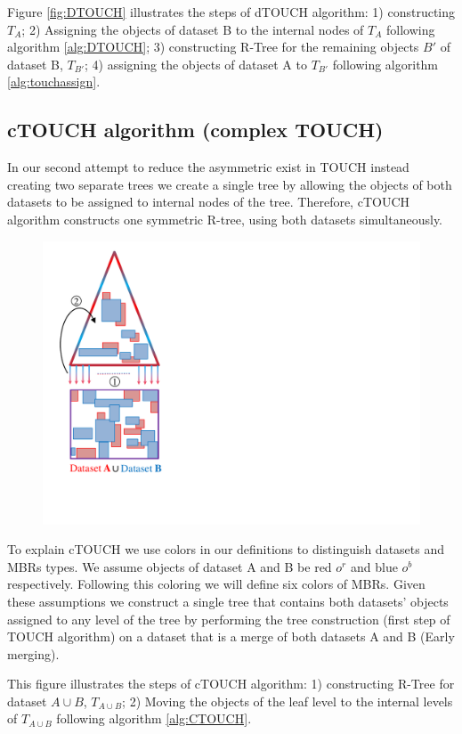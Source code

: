 \documentclass{vldb}
\newcommand{\SJ}{TOUCH}
\newcommand{\dSJ}{dTOUCH}
\newcommand{\cSJ}{cTOUCH}
\begin{document}
Figure \ref{fig:DTOUCH} illustrates the steps of {\dSJ} algorithm: 1) constructing $T_A$; 2) Assigning the objects of dataset B to the internal nodes of $T_A$ following algorithm \ref{alg:DTOUCH}; 3) constructing R-Tree for the remaining objects $B'$ of dataset B, $T_{B'}$; 4) assigning the objects of dataset A to $T_{B'}$ following algorithm \ref{alg:touchassign}.

\subsection{{\cSJ} algorithm (complex {\SJ})}

In our second attempt to reduce the asymmetric exist in {\SJ} instead creating two separate trees we create a single tree by allowing the objects of both datasets to be assigned to internal nodes of the tree. Therefore, {\cSJ} algorithm constructs one symmetric R-tree, using both datasets simultaneously.

\begin{figure}
    \centering
    \includegraphics[width=0.48\columnwidth]{figures/CTouch}
\end{figure}

To explain {\cSJ} we use colors in our definitions to distinguish datasets and MBRs types. We assume objects of dataset A and B be red $o^r$ and blue $o^b$ respectively. Following this coloring we will define six colors of MBRs. Given these assumptions we construct a single tree that contains both datasets’ objects assigned to any level of the tree by performing the tree construction (first step of {\SJ} algorithm) on a dataset that is a merge of both datasets A and B (Early merging).

This figure illustrates the steps of {\cSJ} algorithm: 1) constructing R-Tree for dataset $A \cup B$, $T_{A \cup B}$; 2) Moving the objects of the leaf level to the internal levels of $T_{A \cup B}$ following algorithm \ref{alg:CTOUCH}.
\end{document}
